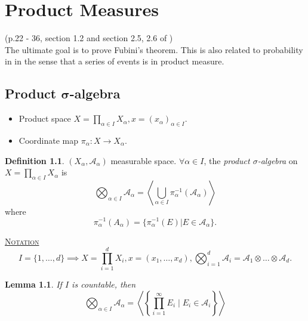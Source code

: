 \documentclass{report}
\newcommand{\cA}{\mathcal{A}}
\newcommand{\gen}[1]{\left\langle #1 \right\rangle}
\newcommand{\fancyem}[1]{\underline{\textsc{#1}}}
\newtheorem{lemma}[theorem]{Lemma}
\theoremstyle{definition}
\newtheorem{definition}[theorem]{Definition}
\theoremstyle{remark}
\newcommand*\ttlmath[2]{\texorpdfstring{$\boldsymbol{#1}$}{#2}}
\begin{document}
\chapter{Product Measures}
(p.22 - 36, section 1.2 and section 2.5, 2.6 of \cite{follandRealAnalysisModern1999}) \\ 
The ultimate goal is to prove Fubini's theorem. This is also related to probability in in the sense that a series of events is in product measure.
\section{Product \ttlmath{\sigma}{sigma}-algebra}
\begin{itemize}
	\item Product space $X = \prod_{\alpha \in I}X_\alpha, x = (x_\alpha)_{\alpha \in I}$.
	\item Coordinate map $\pi_\alpha: X \to X_\alpha$.
\end{itemize}
\begin{definition}
	$(X_\alpha, \cA_\alpha)$ measurable space. $\forall \alpha \in I$, the \emph{product $\sigma$-algebra} on $\displaystyle X = \prod_{\alpha \in I}X_\alpha$ is \[\bigotimes_{\alpha \in I} \cA_\alpha  = \gen{\bigcup_{\alpha \in I}\pi_\alpha^{-1}\left(\cA_\alpha\right)}\]
	where \[
		\pi^{-1}_\alpha\left(A_\alpha\right) = \{\pi^{-1}_\alpha(E) | E \in \cA_\alpha\}.
	\]
\end{definition}
\fancyem{Notation} \[I = \{1, \ldots, d\} \implies X = \prod_{i=1}^d X_i, x = (x_1, \ldots, x_d), \bigotimes_{i=1}^d \cA_i = \cA_1 \otimes \ldots \otimes \cA_d.\]

\begin{lemma}
	If $I$ is countable, then 
	\[
		\bigotimes_{\alpha \in I} \cA_\alpha = \gen{\left\lbrace \prod_{i=1}^\infty E_i \mid E_i \in \cA_i \right\rbrace}
	\]
\end{lemma}
\end{document}
